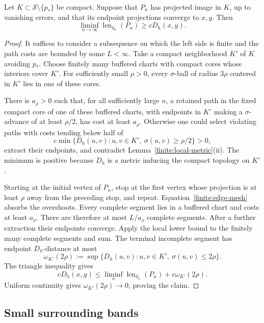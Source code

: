 \begin{lemma}
\label{finite:compact-lower}
Let \(K\subset\mathcal S\setminus\{p_*\}\) be compact.
Suppose that \(P_n\) has projected image in \(K\), up to vanishing
errors, and that its endpoint projections converge to \(x,y\).
Then
\[
       \liminf_{n\to\infty}
          \operatorname{len}_{\delta_n}(P_n)
                    \ge cD_h(x,y).
\]
\end{lemma}

\begin{proof}
It suffices to consider a subsequence on which the left side is
finite and the path costs are bounded by some \(L<\infty\).
Take a compact neighborhood \(K'\) of \(K\) avoiding \(p_*\).
Choose finitely many buffered charts with compact cores whose
interiors cover \(K'\).
For sufficiently small \(\rho>0\), every
\(\sigma\)-ball of radius \(3\rho\) centered in \(K'\) lies in one
of these cores.

There is \(a_\rho>0\) such that, for all sufficiently large \(n\),
a retained path in the fixed compact core of one of these buffered
charts, with endpoints in \(K'\) making a \(\sigma\)-advance of at
least \(\rho/2\), has cost at least \(a_\rho\).
Otherwise one could select violating paths with costs tending
below half of
\[
 c\min\{D_h(u,v):u,v\in K',\ \sigma(u,v)\ge\rho/2\}>0,
\]
extract their endpoints, and contradict
Lemma~\ref{finite:local-metric}(ii).
The minimum is positive because \(D_h\) is a metric inducing the
compact topology on \(K'\).

Starting at the initial vertex of \(P_n\), stop at the first vertex
whose projection is at least \(\rho\) away from the preceding stop, and
repeat.  Equation~\eqref{finite:edge-mesh} absorbs the overshoots.
Every complete segment lies in a buffered chart and costs at least
\(a_\rho\).  There are therefore at most \(L/a_\rho\) complete
segments.  After a further extraction their endpoints converge.
Apply the local lower bound to the finitely many complete
segments and sum.  The terminal incomplete segment has endpoint
\(D_h\)-distance at most
\[
 \omega_{K'}(2\rho)
   :=\sup\{D_h(u,v):u,v\in K',\ \sigma(u,v)\le2\rho\}.
\]
The triangle inequality gives
\[
 cD_h(x,y)
 \le \liminf_n\operatorname{len}_{\delta_n}(P_n)
       +c\omega_{K'}(2\rho).
\]
Uniform continuity gives \(\omega_{K'}(2\rho)\to0\), proving the
claim.
\end{proof}

\subsection{Small surrounding bands}

